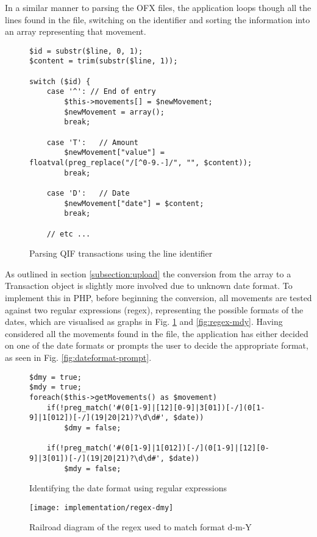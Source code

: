 In a similar manner to parsing the OFX files, the application loops though all the lines found in the file, switching on the identifier and sorting the information into an array representing that movement. 

\begin{figure}
\lstset{style=phpcolor}
\begin{lstlisting}
$id = substr($line, 0, 1);
$content = trim(substr($line, 1));

switch ($id) {
	case '^': // End of entry
		$this->movements[] = $newMovement;
		$newMovement = array();
		break;
		
	case 'T': 	// Amount
		$newMovement["value"] = floatval(preg_replace("/[^0-9.-]/", "", $content));
		break;
		
	case 'D': 	// Date
		$newMovement["date"] = $content;
		break;
		
	// etc ...
\end{lstlisting}
\caption{Parsing QIF transactions using the line identifier}
\end{figure}

As outlined in section \ref{subsection:upload} the conversion from the array to a Transaction object is slightly more involved due to unknown date format. To implement this in PHP, before beginning the conversion, all movements are tested against two regular expressions (regex), representing the possible formats of the dates, which are visualised as graphs in Fig. \ref{fig:regex-dmy} and \ref{fig:regex-mdy}. 
%
Having considered all the movements found in the file, the application has either decided on one of the date formats or prompts the user to decide the appropriate format, as seen in Fig. \ref{fig:dateformat-prompt}.

\begin{figure}
\lstset{style=phpcolor}
\begin{lstlisting}
$dmy = true;
$mdy = true;
foreach($this->getMovements() as $movement)
	if(!preg_match('#(0[1-9]|[12][0-9]|3[01])[-/](0[1-9]|1[012])[-/](19|20|21)?\d\d#', $date))
		$dmy = false;
	
	if(!preg_match('#(0[1-9]|1[012])[-/](0[1-9]|[12][0-9]|3[01])[-/](19|20|21)?\d\d#', $date))
		$mdy = false;
\end{lstlisting}
\caption{Identifying the date format using regular expressions}
\end{figure}

\begin{figure}[h]
    \centering
    \texttt{[image: implementation/regex-dmy]}
    \caption[Regular expression used to match d-m-Y]{Railroad diagram of the regex used to match format d-m-Y}
    \label{fig:regex-dmy}
\end{figure}

